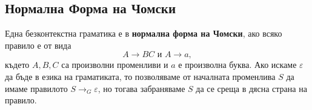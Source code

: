 \subsection{Нормална Форма на Чомски}
Една безконтекстна граматика е в {\bf нормална форма на Чомски}, ако
всяко правило е от вида
\[A \rightarrow BC\mbox{ и }A \rightarrow a,\]
където $A, B, C$ са произволни променливи и $a$ е произволна буква.
Ако искаме $\varepsilon$ да бъде в езика на граматиката, то позволяваме от началната променлива $S$ да имаме правилото $S \to_G \varepsilon$,
но тогава забраняваме $S$ да се среща в дясна страна на правило.

